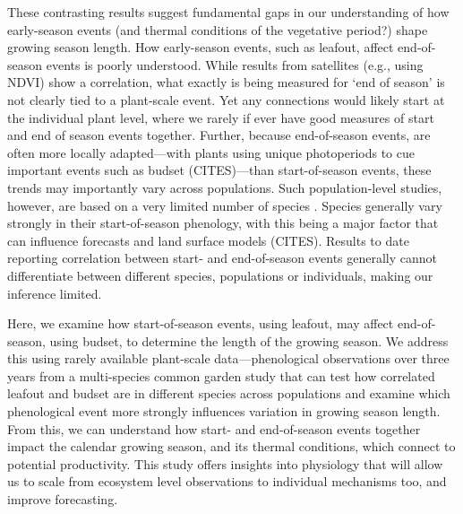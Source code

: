 \documentclass{article}[12pt]
\begin{document}

These contrasting results suggest fundamental gaps in our understanding of how early-season events (and thermal conditions of the vegetative period?) shape growing season length. How early-season events, such as leafout, affect end-of-season events is poorly understood. While results from satellites (e.g., using NDVI) show a correlation,  what exactly is being measured for `end of season' is not clearly tied to a plant-scale event. Yet any connections would likely start at the individual plant level, where we rarely if ever have good measures of start and end of season events together. Further, because end-of-season events, are often more locally adapted---with plants using unique photoperiods to cue important events such as budset (CITES)---than start-of-season events, these trends may importantly vary across populations. Such population-level studies, however, are based on a very limited number of species \citep{Zeng2024}. Species generally vary strongly in their start-of-season phenology, with this being a major factor that can influence forecasts \citep{Morales-Castilla2024} and land surface models (CITES). Results to date reporting correlation between start- and end-of-season events generally cannot differentiate between different species, populations or individuals, making our inference limited. 

Here, we examine how start-of-season events, using leafout, may affect end-of-season, using budset, to determine the length of the growing season.
We address this using rarely available plant-scale data---phenological observations over three years from a multi-species common garden study that can test how correlated leafout and budset are in different species across populations and examine which phenological event more strongly influences variation in growing season length. From this, we can understand how start- and end-of-season events together impact the calendar growing season, and its thermal conditions, which connect to potential productivity. This study offers insights into physiology that will allow us to scale from ecosystem level observations to individual mechanisms too, and improve forecasting. %
\end{document}
